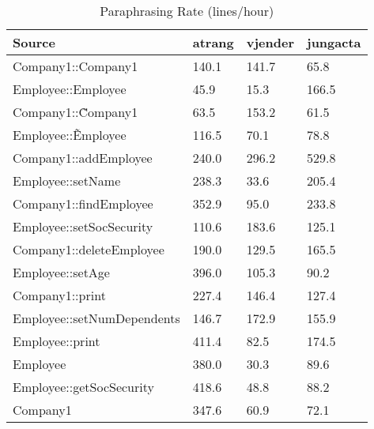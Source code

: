 \begin{table}[hb]
\begin{center}
\begin{tabular}{|l|l|l|l|}
\hline
Source & atrang & vjender & jungacta\\
\hline
Company1::Company1 & 140.1 & 141.7 & 65.8\\
Employee::Employee & 45.9 & 15.3 & 166.5\\
Company1::\~Company1 & 63.5 & 153.2 & 61.5\\
Employee::\~Employee & 116.5 & 70.1 & 78.8\\
Company1::addEmployee & 240.0 & 296.2 & 529.8\\
Employee::setName & 238.3 & 33.6 & 205.4\\
Company1::findEmployee & 352.9 & 95.0 & 233.8\\
Employee::setSocSecurity & 110.6 & 183.6 & 125.1\\
Company1::deleteEmployee & 190.0 & 129.5 & 165.5\\
Employee::setAge & 396.0 & 105.3 & 90.2\\
Company1::print & 227.4 & 146.4 & 127.4\\
Employee::setNumDependents & 146.7 & 172.9 & 155.9\\
Employee::print & 411.4 & 82.5 & 174.5\\
Employee & 380.0 & 30.3 & 89.6\\
Employee::getSocSecurity & 418.6 & 48.8 & 88.2\\
Company1 & 347.6 & 60.9 & 72.1\\
\hline
\end{tabular}
\end{center}
\caption{Paraphrasing Rate (lines/hour)}
\end{table}

